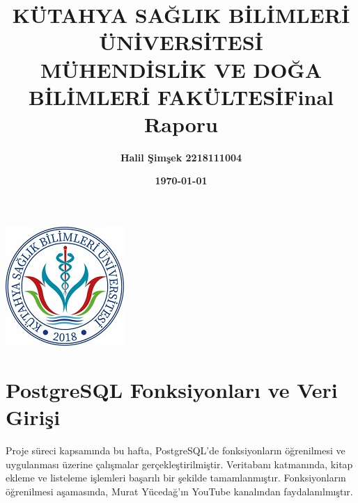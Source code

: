 \documentclass[12pt, a4paper]{article}
\title{\bf\fontsize{12pt}{14pt}\selectfont KÜTAHYA SAĞLIK BİLİMLERİ ÜNİVERSİTESİ \\ MÜHENDİSLİK VE DOĞA BİLİMLERİ FAKÜLTESİ}
\date{}
\begin{document}
	\maketitle
	
	\begin{center}
		\includegraphics[width=0.25\linewidth]{ksbu.jpg}
	\end{center}	
	\begin{center}
		\vspace{1cm} 
	\end{center}
	\begin{center}
		\title{\bf\fontsize{12pt}{14pt}\selectfont Final Raporu}
	\end{center}
	\begin{center}
		\vspace{1cm} %
	\end{center}
	\begin{center}
		
		\author{\bf\fontsize{12pt}{14pt}Halil Şimşek \hspace{1,5cm}2218111004}
		
		\begin{center}
			\vspace{1cm} 
		\end{center}
		\date{\textbf{\today}}
	\end{center}
	\newpage
	
\section{PostgreSQL Fonksiyonları ve Veri Girişi}

Proje süreci kapsamında bu hafta, PostgreSQL'de fonksiyonların öğrenilmesi ve uygulanması üzerine çalışmalar gerçekleştirilmiştir. Veritabanı katmanında, kitap ekleme ve listeleme işlemleri başarılı bir şekilde tamamlanmıştır. Fonksiyonların öğrenilmesi aşamasında, Murat Yücedağ'ın YouTube kanalından faydalanılmıştır. \cite{kanal:isim} \newline
\end{document}
